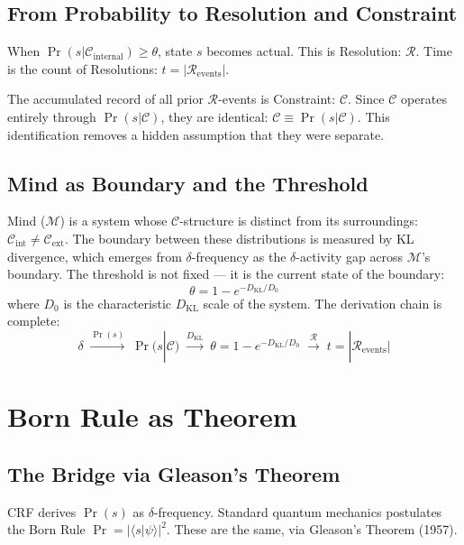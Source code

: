 \documentclass[12pt]{article}
\begin{document}
\subsection{From Probability to Resolution and Constraint}

When $\Pr(s|\mathcal{C}_{\mathrm{internal}}) \geq \theta$, state $s$
becomes actual. This is Resolution: $\mathcal{R}$. Time is the count
of Resolutions: $t = |\mathcal{R}_{\mathrm{events}}|$.

The accumulated record of all prior $\mathcal{R}$-events is
Constraint: $\mathcal{C}$. Since $\mathcal{C}$ operates entirely
through $\Pr(s|\mathcal{C})$, they are identical:
$\mathcal{C} \equiv \Pr(s|\mathcal{C})$. This identification removes
a hidden assumption that they were separate.

\subsection{Mind as Boundary and the Threshold}

Mind ($\mathcal{M}$) is a system whose $\mathcal{C}$-structure is
distinct from its surroundings:
$\mathcal{C}_{\mathrm{int}} \neq \mathcal{C}_{\mathrm{ext}}$. The
boundary between these distributions is measured by KL divergence,
which emerges from $\delta$-frequency as the $\delta$-activity gap
across $\mathcal{M}$'s boundary. The threshold is not fixed --- it
is the current state of the boundary:
\[
  \theta = 1 - e^{-D_{\mathrm{KL}}/D_0}
\]
where $D_0$ is the characteristic $D_{\mathrm{KL}}$ scale of the
system. The derivation chain is complete:
\[
  \delta \;\xrightarrow{\Pr(s)}\; \Pr(s|\mathcal{C})
  \;\xrightarrow{D_{\mathrm{KL}}}\;
  \theta = 1 - e^{-D_{\mathrm{KL}}/D_0}
  \;\xrightarrow{\mathcal{R}}\;
  t = |\mathcal{R}_{\mathrm{events}}|
\]

\section{Born Rule as Theorem}

\subsection{The Bridge via Gleason's Theorem}

CRF derives $\Pr(s)$ as $\delta$-frequency. Standard quantum
mechanics postulates the Born Rule $\Pr = |\langle s|\psi\rangle|^2$.
These are the same, via Gleason's Theorem (1957).
\end{document}
